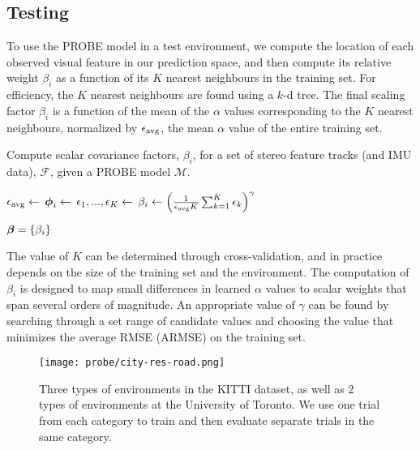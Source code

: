 	\subsection{Testing}
To use the PROBE model in a test environment, we compute the location of each observed visual feature in our prediction space, and then compute its relative weight $\beta_i$ as a function of its $K$ nearest neighbours in the training set.
For efficiency, the $K$ nearest neighbours are found using a $k$-d tree.
The final scaling factor $\beta_i$ is a function of the mean of the $\alpha$ values corresponding to the $K$ nearest neighbours, normalized by $\epsilon_\text{avg}$, the mean $\alpha$ value of the entire training set.

\begin{algorithm}
  \caption{Compute scalar covariance factors, $\beta_i$, for a set of stereo feature tracks (and IMU data), $\mathcal{F}$, given a PROBE model $\mathcal{M}$.}
  \label{alg:probe_test}
  \begin{algorithmic}
     \State $\epsilon_\text{avg} \gets$ 
        \State $\boldsymbol{\mathbf{\phi}}_i \gets$  
        \State $\epsilon_1,...,\epsilon_K \gets$ 
		\State $\beta_i \gets \left(\frac{1}{\epsilon_\text{avg} K} \sum_{k=1}^K \epsilon_k  \right)^{\gamma}$
		
	   \EndFor
      \State\Return $\boldsymbol{\beta} = \{\beta_i\}$
    \EndFunction
  \end{algorithmic}
\end{algorithm}


The value of $K$ can be determined through cross-validation, and in practice depends on the size of the training set and the environment.
The computation of $\beta_i$ is designed to map small differences in learned $\alpha$ values to scalar weights that span several orders of magnitude.
An appropriate value of $\gamma$ can be found by searching through a set range of candidate values and choosing the value that minimizes the average RMSE (ARMSE) on the training set.

\begin{figure}
    \centering
    \texttt{[image: probe/city-res-road.png]}
    \caption{Three types of environments in the KITTI dataset, as well as 2 types of environments at the University of Toronto.  We use one trial from each category to train and then evaluate separate trials in the same category.}
    \label{fig:probe_KITTI-Types}
\end{figure}

